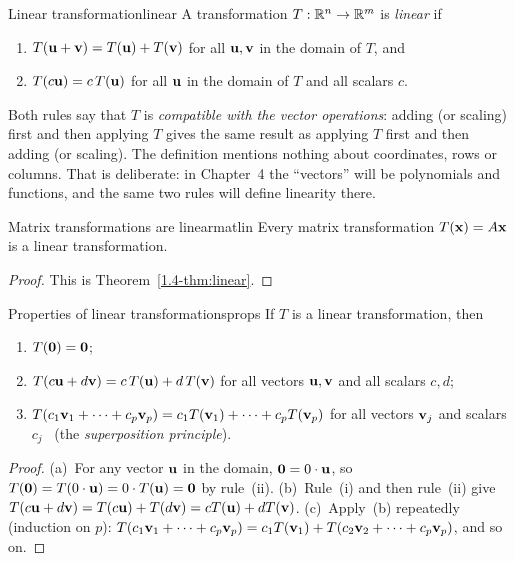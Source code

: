 \documentclass[11pt]{article}
\begin{document}
\begin{defn}{Linear transformation}{linear}
A transformation $T:\mathbb{R}^n\to\mathbb{R}^m$ is \emph{linear} if
\begin{enumerate}[label=(\roman*),itemsep=1pt]
  \item $T(\mathbf{u}+\mathbf{v})=T(\mathbf{u})+T(\mathbf{v})$ for all $\mathbf{u},\mathbf{v}$ in the domain of $T$, and
  \item $T(c\mathbf{u})=c\,T(\mathbf{u})$ for all $\mathbf{u}$ in the domain of $T$ and all scalars $c$.
\end{enumerate}
\end{defn}

Both rules say that $T$ is \emph{compatible with the vector operations}: adding (or scaling) first and then applying $T$ gives the same result as applying $T$ first and then adding (or scaling). The definition mentions nothing about coordinates, rows or columns. That is deliberate: in Chapter~4 the ``vectors'' will be polynomials and functions, and the same two rules will define linearity there.

\begin{thm}{Matrix transformations are linear}{matlin}
Every matrix transformation $T(\mathbf{x})=A\mathbf{x}$ is a linear transformation.
\end{thm}

\begin{proof}
This is Theorem~\ref{1.4-thm:linear}.
\end{proof}

\begin{thm}{Properties of linear transformations}{props}
If $T$ is a linear transformation, then
\begin{enumerate}[label=(\alph*),itemsep=1pt]
  \item $T(\mathbf{0})=\mathbf{0}$;
  \item $T(c\mathbf{u}+d\mathbf{v})=c\,T(\mathbf{u})+d\,T(\mathbf{v})$ for all vectors $\mathbf{u},\mathbf{v}$ and all scalars $c,d$;
  \item $T(c_1\mathbf{v}_1+\cdots+c_p\mathbf{v}_p)=c_1T(\mathbf{v}_1)+\cdots+c_pT(\mathbf{v}_p)$ for all vectors $\mathbf{v}_j$ and scalars $c_j$ \ (the \emph{superposition principle}).
\end{enumerate}
\end{thm}

\begin{proof}
(a)~For any vector $\mathbf{u}$ in the domain, $\mathbf{0}=0\cdot\mathbf{u}$, so $T(\mathbf{0})=T(0\cdot\mathbf{u})=0\cdot T(\mathbf{u})=\mathbf{0}$ by rule~(ii). (b)~Rule~(i) and then rule~(ii) give $T(c\mathbf{u}+d\mathbf{v})=T(c\mathbf{u})+T(d\mathbf{v})=cT(\mathbf{u})+dT(\mathbf{v})$. (c)~Apply~(b) repeatedly (induction on $p$): $T(c_1\mathbf{v}_1+\cdots+c_p\mathbf{v}_p)=c_1T(\mathbf{v}_1)+T(c_2\mathbf{v}_2+\cdots+c_p\mathbf{v}_p)$, and so on.
\end{proof}
\end{document}
